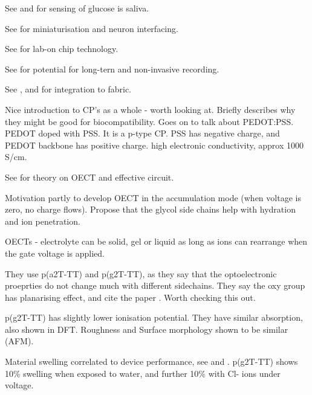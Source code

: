 \documentclass{article}
\begin{document}
See \cite{fraser2011electrochemical} and \cite{shim2009all} for sensing of glucose is saliva. 

See \cite{sessolo2013simple} for miniaturisation and neuron interfacing. 

See \cite{mabeck2005microfluidic} for lab-on chip technology. 

See \cite{leleux2011highly} for potential for long-tern and non-invasive recording.

See \cite{hamedi2007towards}, \cite{mattana2011organic} and \cite{muller2011woven} for integration to fabric. 

Nice introduction to CP's as a whole - worth looking at.  Briefly describes why they might be good for biocompatibility.  Goes on to talk about PEDOT:PSS.  PEDOT doped with PSS.  It is a p-type CP.  PSS has negative charge, and PEDOT backbone has positive charge.  high electronic conductivity, approx 1000 S/cm.  

See \cite{Bernards2007} for theory on OECT and effective circuit. 








 \vspace{1cm}
{\bf \cite{Giovannitti2016}}

Motivation partly to develop OECT in the accumulation mode (when voltage is zero, no charge flows). Propose that the glycol side chains help with hydration and ion penetration.  

OECTs - electrolyte can be solid, gel or liquid as long as ions can rearrange when the gate voltage is applied.   

They use p(a2T-TT) and p(g2T-TT), as they say that the optoelectronic proeprties do not change much with different sidechains.  They say the oxy group has planarising effect, and cite the paper \cite{Guo2013}.  Worth checking this out. 

p(g2T-TT) has slightly lower ionisation potential.  They have similar absorption, also shown in DFT. Roughness and Surface morphology shown to be similar (AFM).  

Material swelling correlated to device performance, see \cite{Inal2016} and \cite{Stavrinidou2013}.  p(g2T-TT) shows 10\% swelling when exposed to water, and further 10\% with Cl- ions under voltage. 




 \vspace{1cm}
{\bf \cite{Giovannitti2018}}
\end{document}

